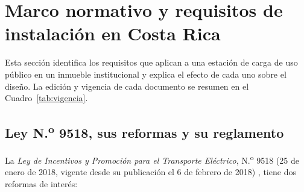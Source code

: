 \section{Marco normativo y requisitos de instalación en Costa Rica}
\label{sec:normativa}
Esta sección identifica los requisitos que aplican a una estación de carga de uso público en un inmueble institucional y explica el efecto de cada uno sobre el diseño. La edición y vigencia de cada documento se resumen en el Cuadro~\ref{tab:vigencia}.

\subsection{Ley N.\textsuperscript{o} 9518, sus reformas y su reglamento}
\label{sec:ley9518}
La \emph{Ley de Incentivos y Promoción para el Transporte Eléctrico}, N.\textsuperscript{o} 9518 (25 de enero de 2018, vigente desde su publicación el 6 de febrero de 2018) \cite{ley9518,dec41428}, tiene dos reformas de interés:
